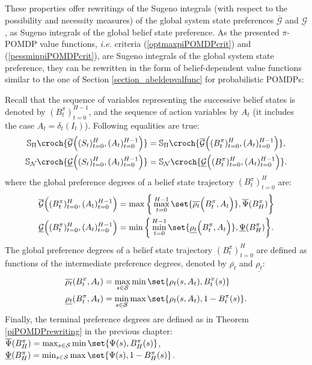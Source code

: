 These properties offer rewritings of the Sugeno integrals 
(with respect to the possibility and necessity measures) 
of the global system state preferences 
$\overline{\mathcal{G}}$ and $\underline{\mathcal{G}}$, 
as Sugeno integrals of the global belief state preference.
As the presented $\pi$-POMDP value functions, 
\textit{i.e.} criteria (\ref{optmaxpiPOMDPcrit})
and (\ref{pessminpiPOMDPcrit}), are Sugeno integrals 
of the global system state preference,
they can be rewritten in the form of belief-dependent
value functions similar to the one of Section \ref{section_abeldepvalfunc} 
for probabilistic POMDPs:\\
\begin{theorem}
Recall that the sequence of variables representing the successive belief states
is denoted by $(B^{\pi}_t)_{t=0}^{H-1}$, and the sequence of action variables
by $A_t$ (it includes the case $A_t = \delta_t(I_t)$). 
Following equalities are true:
\label{theorem_intermpref}
\begin{align}
\mathbb{S}_{\Pi} \croch{  \overline{\mathcal{G}} \Big( (S_t)_{t=0}^{H}, (A_t)_{t=0}^{H-1} \Big) } &= \mathbb{S}_{\Pi} \croch{ \overline{\mathcal{G}} \Big( (B^{\pi}_t)_{t=0}^{H},  (A_t)_{t=0}^{H-1} \Big)  }, \\
\mathbb{S}_{\mathcal{N}} \croch{ \underline{\mathcal{G}} \Big( (S_t)_{t=0}^{H}, (A_t)_{t=0}^{H-1} \Big)  } &= \mathbb{S}_{\mathcal{N}} \croch{\underline{\mathcal{G}} \Big( (B^{\pi}_t)_{t=0}^{H},  (A_t)_{t=0}^{H-1} \Big) }.
\end{align}
where the global preference degrees of a belief state trajectory $(B^{\pi}_t)_{t=0}^{H}$ are:
\begin{align*}
\overline{\mathcal{G}} \Big( (B^{\pi}_t)_{t=0}^{H}, (A_t)_{t=0}^{H-1} \Big) &= \max \bigg\{ \max_{t=0}^{H-1} \set{ \overline{\rho_t}\Big( B_t^{\pi}, A_t \Big)  }, \overline{\Psi}(B_H^{\pi}) \bigg\}\\ 
\underline{\mathcal{G}} \Big( (B^{\pi}_t)_{t=0}^{H}, (A_t)_{t=0}^{H-1} \Big) &= \min \bigg\{ \min_{t=0}^{H-1} \set{ \underline{\rho_t}\Big( B_t^{\pi}, A_t \Big)  }, \underline{\Psi}(B_H^{\pi}) \bigg\}.
\end{align*}
The global preference degrees of a belief state trajectory $(B^{\pi}_t)_{t=0}^H$ 
are defined as functions of the intermediate preference degrees, 
denoted by $\overline{\rho_t}$ and $\underline{\rho_t}$:
\begin{align*}
\overline{\rho_t}(B^{\pi}_t,A_t) & = \max_{s \in \mathcal{S}} \min \set{ \rho_t(s,A_t) , B^{\pi}_t(s) } \\ 
\underline{\rho_t}(B^{\pi}_t,A_t) & = \min_{s \in \mathcal{S}} \max \set{ \rho_t(s,A_t), 1 - B^{\pi}_t(s) }.
\end{align*}
Finally, the terminal preference degrees are defined as in Theorem \ref{piPOMDPrewriting}
in the previous chapter: $\overline{\Psi}(B^{\pi}_H)= \max_{s \in \mathcal{S}} \min \set{ \Psi(s) , B^{\pi}_H(s) }$,
$\underline{\Psi}(B^{\pi}_H) = \min_{s \in \mathcal{S}} \max \set{ \Psi(s) , 1 - B^{\pi}_H(s) }$.
\end{theorem}
